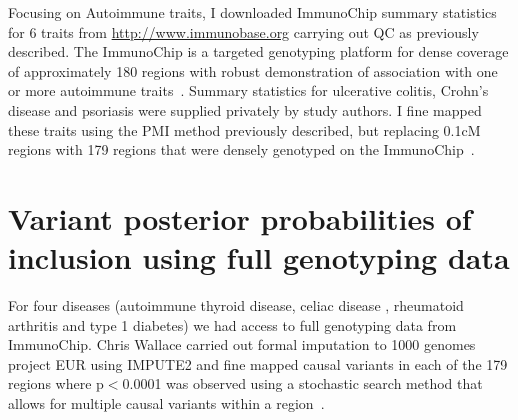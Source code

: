 \documentclass[a4paper,11pt]{report}
\begin{document}
Focusing on Autoimmune traits,  I downloaded  ImmunoChip summary statistics for 6 traits from \url{http://www.immunobase.org} carrying out QC as previously described. The ImmunoChip is a targeted genotyping platform for dense coverage of approximately 180 regions with robust demonstration of association with one or more autoimmune traits~\citep{CortesBrown2011}. Summary statistics for ulcerative colitis, Crohn's disease and psoriasis were supplied privately by study authors. I fine mapped these traits using the PMI method previously described, but replacing 0.1cM regions with 179 regions that were densely genotyped on the ImmunoChip~\citep{Onengut-Gumuscu2015-lb}.

\section{Variant posterior probabilities of inclusion using full genotyping data}

For four diseases (autoimmune thyroid disease, celiac disease , rheumatoid arthritis and type 1 diabetes) we had access to full genotyping data from ImmunoChip. Chris Wallace carried out formal imputation to 1000 genomes project EUR using IMPUTE2 and fine mapped causal variants in each of the 179 regions where p$<$0.0001 was observed using a stochastic search method that allows for multiple causal variants within a region~\citep{WallaceCutlerPontikosEtAl2015}. 
\end{document}
